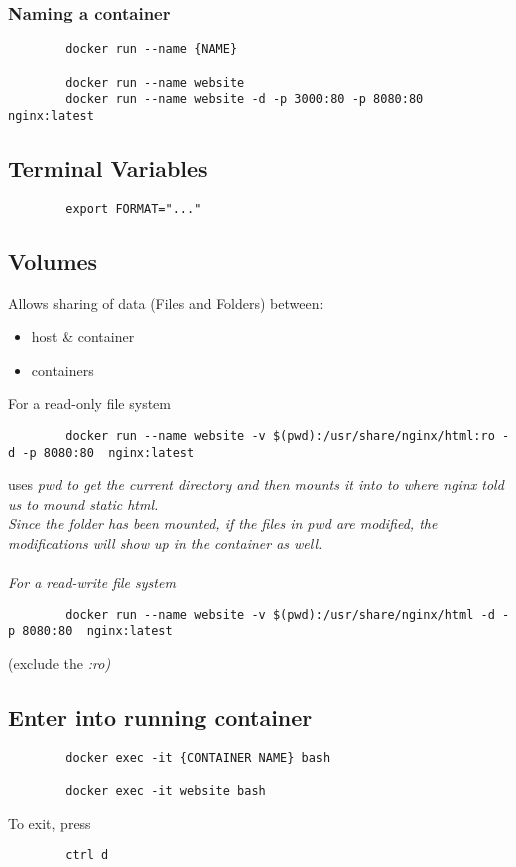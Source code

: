 \subsubsection{Naming a container}
\begin{lstlisting}
        docker run --name {NAME}

        docker run --name website
        docker run --name website -d -p 3000:80 -p 8080:80 nginx:latest
\end{lstlisting}

\subsection{Terminal Variables}\label{subsec:terminal-variables}
\begin{lstlisting}
        export FORMAT="..."
\end{lstlisting}


\subsection{Volumes}\label{subsec:volumes}
Allows sharing of data (Files and Folders) between:
\begin{itemize}
    \item host \& container
    \item containers
\end{itemize}
For a read-only file system
\begin{lstlisting}
        docker run --name website -v $(pwd):/usr/share/nginx/html:ro -d -p 8080:80  nginx:latest
\end{lstlisting}
uses \it{pwd} to get the current directory and then mounts it into to where nginx told us to mound static html.\\
Since the folder has been mounted, if the files in pwd are modified, the modifications will show up in the container as well.\\\\
For a read-write file system
\begin{lstlisting}
        docker run --name website -v $(pwd):/usr/share/nginx/html -d -p 8080:80  nginx:latest
\end{lstlisting}
(exclude the \it{:ro})

\subsection{Enter into running container}
\begin{lstlisting}
        docker exec -it {CONTAINER NAME} bash

        docker exec -it website bash
\end{lstlisting}
To exit, press
\begin{lstlisting}
        ctrl d
\end{lstlisting}


